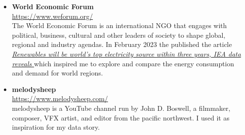 \documentclass{article}
\begin{document}
\begin{itemize}
    \item \textbf{World Economic Forum} \\
    \url{https://www.weforum.org/} \\
    The World Economic Forum is an international NGO that engages with political, business, cultural and other leaders of society to shape global, regional and industry agendas.
    In February 2023 the published the article \textit{\href{https://www.weforum.org/agenda/2023/02/renewables-world-top-electricity-source-data/}{Renewables will be world's top electricity source within three years, IEA data reveals
    }} which inspired me to explore and compare the energy consumption and demand for world regions.
    
    \newpage
    \item \textbf{melodysheep} \\
    \url{https://www.melodysheep.com/} \\
    melodysheep is a YouTube channel run by John D. Boswell, a filmmaker, composer, VFX artist, and editor from the pacific northwest.
    I used it as inspiration for my data story.
\end{itemize}
\end{document}

